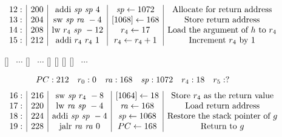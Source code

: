 \documentclass[acmsmall,review,anonymous]{acmart}\settopmatter{printfolios=true,printccs=false,printacmref=false}
\begin{document}
\begin{figure}
\[\]
\vspace*{0.2em}
\[
\begin{array}{r|c|c|c|c}
  12: & 200 & \text{addi} ~ \mathit{sp} ~ \mathit{sp} ~ 4 & \mathit{sp} \leftarrow 1072 & \text{Allocate for return address}\\
  13: & 204 & \text{sw} ~ \mathit{sp} ~ \mathit{ra} ~ -4 & [1068] \leftarrow 168 & \text{Store return address}\\
  14: & 208 & \text{lw} ~ r_4 ~ \mathit{sp} ~ -12 & r_4 \leftarrow 17 & \text{Load the argument of $h$ to $r_4$}\\
  15: & 212 & \text{addi} ~ r_4 ~ r_4 ~ 1 & r_4 \leftarrow r_4 + 1 & \text{Increment $r_4$ by 1}\\\end{array}
\]
\begin{center}
\MemoryLabel{52em}{1.8em}{$\downarrow$}
[{}]%
~$\cdots$
[{}]%
~$\cdots$
[{}]%
[{}]%
[{}]%
%
[{}]
~$\cdots$
\\
\end{center}
\[
\begin{array}{cccccc}
  PC: 212 & r_0 : 0 & \mathit{ra} : 168 & \mathit{sp} : 1072 & r_4 : 18 & r_5 : ? 
\end{array}
\]
\vspace*{0.2em}
\[
\begin{array}{r|c|c|c|c}
  16: & 216 & \text{sw} ~ \mathit{sp} ~ r_4 ~ -8 & [1064] \leftarrow 18 & \text{Store $r_4$ as the return value}\\
  17: & 220 & \text{lw} ~ \mathit{ra} ~ \mathit{sp} ~ -4 & \mathit{ra} \leftarrow 168 & \text{Load return address}\\
  18: & 224 & \text{addi} ~ \mathit{sp} ~ \mathit{sp} ~ -4 & \mathit{sp} \leftarrow 1068 & \text{Restore the stack pointer of $g$}\\
  19: & 228 & \text{jalr} ~ \mathit{ra} ~ \mathit{ra} ~ 0 & PC \leftarrow 168 & \text{Return to $g$}\\
  \end{array}
\]
\label{fig:running-trace-a}
\end{figure}
\end{document}
